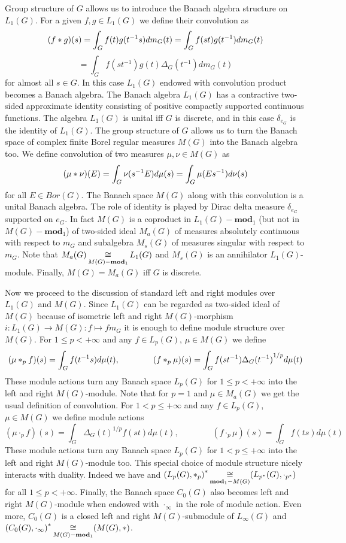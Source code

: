 Group structure of $G$ allows us to introduce the Banach algebra structure on
$L_1(G)$. For a given $f,g\in L_1(G)$ we define their convolution as
$$
(f\ast g)(s)=\int_G f(t)g(t^{-1}s)dm_G(t)=\int_G f(st)g(t^{-1})dm_G(t)
$$
$$=\int_G f(st^{-1})g(t)\Delta_G(t^{-1})dm_G(t)
$$
for almost all $s\in G$. In this case $L_1(G)$ endowed with convolution 
product becomes a Banach algebra. The Banach algebra $L_1(G)$ has a 
contractive two-sided approximate identity consisting of positive compactly 
supported continuous functions. The algebra $L_1(G)$ is unital iff $G$ is 
discrete, and in this case $\delta_{e_G}$ is the identity of $L_1(G)$. The 
group structure of $G$ allows us to turn the Banach space of complex finite 
Borel regular measures $M(G)$ into the Banach algebra too. We define 
convolution of two measures $\mu,\nu\in M(G)$ as
$$
(\mu\ast \nu)(E)=\int_G\nu(s^{-1}E)d\mu(s)=\int_G\mu(Es^{-1})d\nu(s)
$$
for all $E\in Bor(G)$. The Banach space $M(G)$ along with this convolution is 
a unital Banach algebra. The role of identity is played by Dirac delta 
measure $\delta_{e_G}$ supported on $e_G$. In fact $M(G)$ is a coproduct 
in $L_1(G)-\mathbf{mod}_1$ (but not in $M(G)-\mathbf{mod}_1$) of two-sided 
ideal $M_a(G)$ of measures absolutely continuous with respect to $m_G$ and 
subalgebra $M_s(G)$ of measures singular with respect to $m_G$. Note 
that $M_a(G)\mathop{\mathbin{\cong}}\limits_{M(G)-\mathbf{mod}_1}L_1(G)$ and $M_s(G)$ is an 
annihilator $L_1(G)$-module. Finally, $M(G)=M_a(G)$ iff $G$ is discrete. 

Now we proceed to the discussion of standard left and right modules 
over $L_1(G)$ and $M(G)$. Since $L_1(G)$ can be regarded as two-sided ideal 
of $M(G)$ because of isometric left and 
right $M(G)$-morphism $i:L_1(G)\to M(G):f\mapsto f m_G$ it is enough to define 
module structure over $M(G)$. For $1\leq p<+\infty$ and 
any $f\in L_p(G)$, $\mu\in M(G)$ we define
$$
(\mu\ast_p f)(s)=\int_G f(t^{-1}s)d\mu(t), \qquad\qquad (f\ast_p
\mu)(s)=\int_G f(st^{-1}){\Delta_G(t^{-1})}^{1/p}d\mu(t)
$$
These module actions turn any Banach space $L_p(G)$ for $1\leq p<+\infty$ into 
the left and right $M(G)$-module. Note that for $p=1$ and $\mu\in M_a(G)$ we 
get the usual definition of convolution. For $1<p\leq +\infty$ and 
any $f\in L_p(G)$, $\mu\in M(G)$ we define module actions
$$
(\mu\cdot_p f)(s)=\int_G {\Delta_G(t)}^{1/p}f(st)d\mu(t), \qquad\qquad (f\cdot_p
\mu)(s)=\int_G f(ts)d\mu(t)
$$
These module actions turn any Banach space $L_p(G)$ for $1<p\leq+\infty$ into 
the left and right $M(G)$-module too. This special choice of module structure 
nicely interacts with duality. Indeed we have 
and ${(L_p(G),\ast_p)}^*\mathop{\mathbin{\cong}}\limits_{\mathbf{mod}_1-M(G)}(L_{p^*}(G),\cdot_{p^*})$ 
for all $1\leq p<+\infty$. Finally, the Banach space $C_0(G)$ also becomes left 
and right $M(G)$-module when endowed with $\cdot_\infty$ in the role of module 
action. Even more, $C_0(G)$ is a closed left and right $M(G)$-submodule 
of $L_\infty(G)$ 
and ${(C_0(G),\cdot_\infty)}^*\mathop{\mathbin{\cong}}\limits_{M(G)-\mathbf{mod}_1}(M(G),\ast)$.

